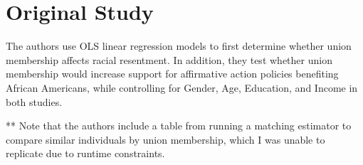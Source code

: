 \documentclass[12pt,letterpaper]{article}
\begin{document}
\maketitle
\section*{Original Study}
The authors use OLS linear regression models to first determine whether union membership affects racial resentment. In addition, they test whether union membership would increase support for affirmative action policies benefiting African Americans, while controlling for Gender, Age, Education, and Income in both studies.


** Note that the authors include a table from running a matching estimator to compare similar individuals by union membership, which I was unable to replicate due to runtime constraints. 
\end{document}
